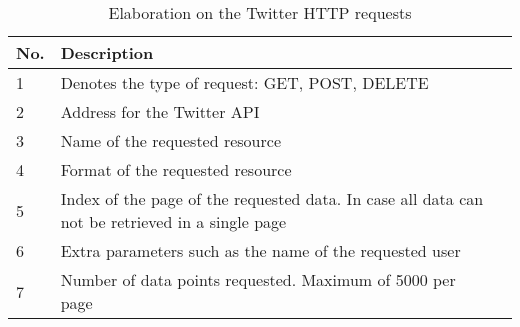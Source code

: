 \begin{table}[H] 
\begin{centering}
\begin{tabular}{|l|p{9cm}|l|}
\hline
No.			&	Description 		\\\hline
1			&	Denotes the type of request: GET, POST, DELETE 					\\\hline
2			&	Address for the Twitter \ac{API}					\\\hline
3			&	Name of the requested resource	   					\\\hline
4			&	Format of the requested resource					\\\hline
5			&	Index of the page of the requested data. In case all data can not be
retrieved in a single page \\\hline 
6			&	Extra parameters such as the name of the requested user					\\\hline
7			&	Number of data points requested. Maximum of 5000 per page					\\\hline
\end{tabular}
\caption{Elaboration on the Twitter HTTP requests}
\label{httpElaboration}
\end{centering}
\end{table}
